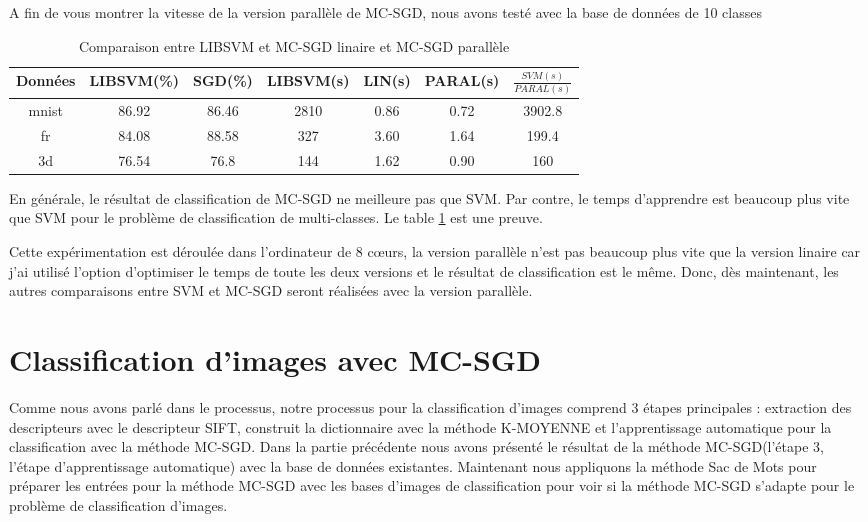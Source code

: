 A fin de vous montrer la vitesse de la version parallèle de MC-SGD, nous avons testé avec la base de données de 10 classes\\

\pagebreak
\begin{table}
\begin{center}
    \begin{tabular}{ | c | c | c | c | c | c | c |}
    \hline
    Données & LIBSVM(\%) & SGD(\%) & LIBSVM(s) & LIN(s) & PARAL(s) & $\frac{SVM(s)}{PARAL(s)}$ \\ \hline
    
    mnist & 86.92 & 86.46 & 2810 & 0.86 & 0.72 & 3902.8 \\ \hline
    
    fr & 84.08 & 88.58 & 327 & 3.60 & 1.64 & 199.4 \\ \hline
    
    3d & 76.54 & 76.8 & 144 & 1.62 & 0.90 & 160 \\ \hline
    
    \end{tabular}
\end{center}
\caption{Comparaison entre LIBSVM et MC-SGD linaire et MC-SGD parallèle}
\label{tab:pmcsvm}
\end{table}


En générale, le résultat de classification de MC-SGD ne meilleure pas que SVM. Par contre, le temps d'apprendre est beaucoup plus vite que SVM pour le problème de classification de multi-classes. Le table \ref{tab:pmcsvm} est une preuve.

Cette expérimentation est déroulée dans l'ordinateur de 8 cœurs, la version parallèle n'est pas beaucoup plus vite que la version linaire car j'ai utilisé l'option d'optimiser le temps de toute les deux versions et le résultat de classification est le même. Donc, dès maintenant, les autres comparaisons entre SVM et MC-SGD seront réalisées avec la version parallèle.


\section{Classification d'images avec MC-SGD}
Comme nous avons parlé dans le processus, notre processus pour la classification d'images comprend 3 étapes principales : extraction des descripteurs avec le descripteur SIFT, construit la dictionnaire avec la méthode K-MOYENNE et l'apprentissage automatique pour la classification avec la méthode MC-SGD. Dans la partie précédente nous avons présenté le résultat de la méthode MC-SGD(l'étape 3, l'étape d'apprentissage automatique) avec la base de données existantes. Maintenant nous appliquons la méthode Sac de Mots pour préparer les entrées pour la méthode MC-SGD avec les bases d'images de classification pour voir si la méthode MC-SGD s'adapte pour le problème de classification d'images.

